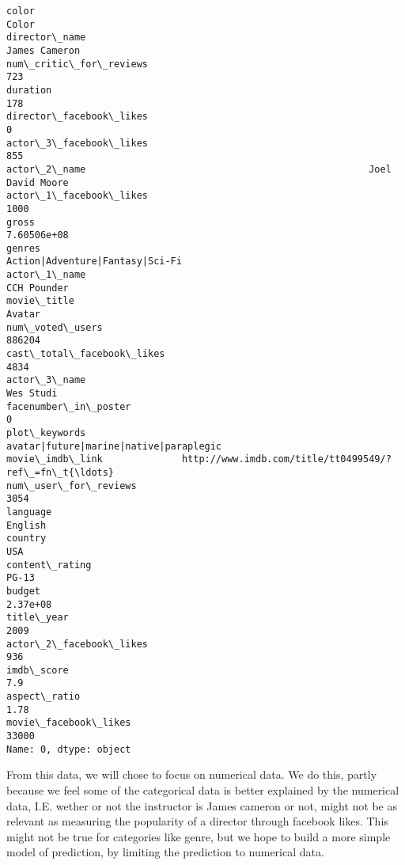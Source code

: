 \documentclass[11pt]{article}
\begin{document}
    \begin{Verbatim}[commandchars=\\\{\}]
color                                                                    Color
director\_name                                                    James Cameron
num\_critic\_for\_reviews                                                     723
duration                                                                   178
director\_facebook\_likes                                                      0
actor\_3\_facebook\_likes                                                     855
actor\_2\_name                                                  Joel David Moore
actor\_1\_facebook\_likes                                                    1000
gross                                                              7.60506e+08
genres                                         Action|Adventure|Fantasy|Sci-Fi
actor\_1\_name                                                       CCH Pounder
movie\_title                                                            Avatar 
num\_voted\_users                                                         886204
cast\_total\_facebook\_likes                                                 4834
actor\_3\_name                                                         Wes Studi
facenumber\_in\_poster                                                         0
plot\_keywords                           avatar|future|marine|native|paraplegic
movie\_imdb\_link              http://www.imdb.com/title/tt0499549/?ref\_=fn\_t{\ldots}
num\_user\_for\_reviews                                                      3054
language                                                               English
country                                                                    USA
content\_rating                                                           PG-13
budget                                                                2.37e+08
title\_year                                                                2009
actor\_2\_facebook\_likes                                                     936
imdb\_score                                                                 7.9
aspect\_ratio                                                              1.78
movie\_facebook\_likes                                                     33000
Name: 0, dtype: object

    \end{Verbatim}

    From this data, we will chose to focus on numerical data. We do this,
partly because we feel some of the categorical data is better explained
by the numerical data, I.E. wether or not the instructor is James
cameron or not, might not be as relevant as measuring the popularity of
a director through facebook likes. This might not be true for categories
like genre, but we hope to build a more simple model of prediction, by
limiting the prediction to numerical data.
\end{document}
